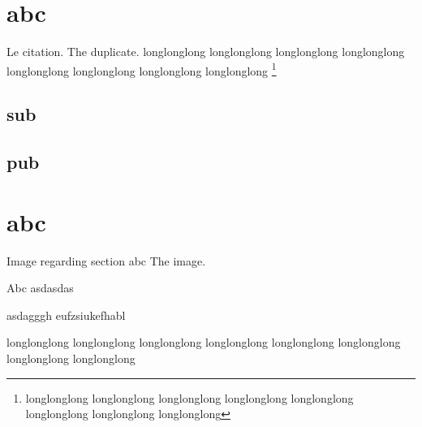 \documentclass[first=firstname,last=lastname,company=comp,location=Dresden]{baarticle}
\begin{document}
    \section{abc}
    Le citation.
    The duplicate.
    longlonglong longlonglong longlonglong longlonglong longlonglong longlonglong longlonglong longlonglong
    \footnote{longlonglong longlonglong longlonglong longlonglong longlonglong longlonglong longlonglong longlonglong}
    \subsection{sub}
    \subsection{pub}
    \section{abc}
    \begin{bafigure}{Image regarding section abc}
        The image.
    \end{bafigure}
    \clearpage
    \begin{baappx}
        \begin{bafigure}{Abc}
            asdasdas
        \end{bafigure}
    asdagggh
    eufzsiukefhabl
    \end{baappx}
    \clearpage
    \printbibliography[heading=bibintoc]
    longlonglong longlonglong longlonglong longlonglong longlonglong longlonglong longlonglong longlonglong
    \clearpage
\end{document}
